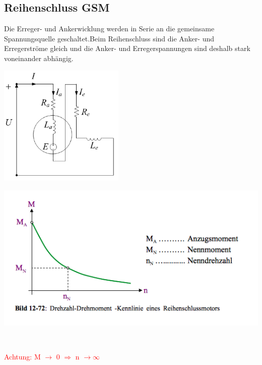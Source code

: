 \subsection{Reihenschluss GSM}
Die Erreger- und Ankerwicklung werden in Serie an die gemeinsame Spannungsquelle geschaltet.\newline Beim Reihenschluss sind die Anker- und Erregerströme gleich und die Anker- und Erregerspannungen sind deshalb \newline stark voneinander abhängig.\newline
\begin{minipage}[b]{0.4\textwidth}
	\raggedright
	\includegraphics[width=6cm]{images/Reihenschluss.png}
\end{minipage}
\begin{minipage}[b]{0.5\textwidth}
	\raggedright
	\includegraphics[scale = 0.6]{images/KennlinieReihenschluss}
\end{minipage}\\
\begin{minipage}[b]{0.7\linewidth}
    \raggedleft
    \textcolor{red}{Achtung: M $\rightarrow$ 0 $\Rightarrow$ n $\rightarrow \infty$}
\end{minipage}
\\

